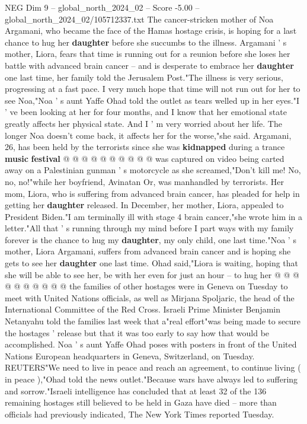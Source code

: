 \begin{textsample}{NEG Dim 9 – global\_north\_2024\_02 – Score -5.00 – global\_north\_2024\_02/105712337.txt}  \label{ex:f9_neg_290}
The cancer-stricken mother of Noa Argamani, who became the face of the Hamas hostage crisis, is hoping for a last chance to hug her \textbf{daughter} before she succumbs to the illness.
Argamani ' s mother, Liora, fears that time is running out for a reunion before she loses her battle with advanced brain cancer -- and is desperate to embrace her \textbf{daughter} one last time, her family told the Jerusalem Post."The illness is very serious, progressing at a fast pace.
I very much hope that time will not run out for her to see Noa,"Noa ' s aunt Yaffe Ohad told the outlet as tears welled up in her eyes."I ' ve been looking at her for four months, and I know that her emotional state greatly affects her physical state.
And I ' m very worried about her life.
The longer Noa doesn't come back, it affects her for the worse,"she said.
Argamani, 26, has been held by the terrorists since she was \textbf{kidnapped} during a trance \textbf{music} \textbf{festival} @ @ @ @ @ @ @ @ @ @ was captured on video being carted away on a Palestinian gunman ' s motorcycle as she screamed,"Don't kill me!
No, no, no!"while her boyfriend, Avinatan Or, was manhandled by terrorists.
Her mom, Liora, who is suffering from advanced brain cancer, has pleaded for help in getting her \textbf{daughter} released.
In December, her mother, Liora, appealed to President Biden."I am terminally ill with stage 4 brain cancer,"she wrote him in a letter."All that ' s running through my mind before I part ways with my family forever is the chance to hug my \textbf{daughter}, my only child, one last time."Noa ' s mother, Liora Argamani, suffers from advanced brain cancer and is hoping she gets to see her \textbf{daughter} one last time.
Ohad said,"Liora is waiting, hoping that she will be able to see her, be with her even for just an hour -- to hug her @ @ @ @ @ @ @ @ @ @ the families of other hostages were in Geneva on Tuesday to meet with United Nations officials, as well as Mirjana Spoljaric, the head of the International Committee of the Red Cross.
Israeli Prime Minister Benjamin Netanyahu told the families last week that a"real effort"was being made to secure the hostages ' release but that it was too early to say how that would be accomplished.
Noa ' s aunt Yaffe Ohad poses with posters in front of the United Nations European headquarters in Geneva, Switzerland, on Tuesday.
REUTERS"We need to live in peace and reach an agreement, to continue living ( in peace ),"Ohad told the news outlet."Because wars have always led to suffering and sorrow."Israeli intelligence has concluded that at least 32 of the 136 remaining hostages still believed to be held in Gaza have died -- more than officials had previously indicated, The New York Times reported Tuesday.

\end{textsample}
